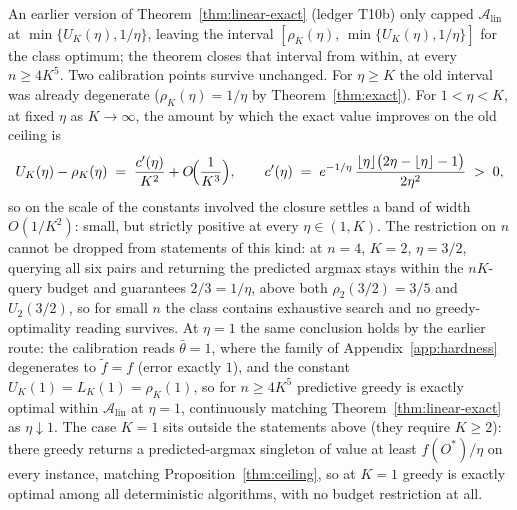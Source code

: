 \begin{remark}\label{rem:greedybudget}
An earlier version of Theorem~\ref{thm:linear-exact} (ledger T10b) only
capped $\mathcal A_{\mathrm{lin}}$ at $\min\{U_K(\eta),1/\eta\}$, leaving
the interval $[\rho_K(\eta),\,\min\{U_K(\eta),1/\eta\}]$ for the class
optimum; the theorem closes that interval from within, at every
$n\ge4K^{5}$.  Two calibration points survive unchanged.  For $\eta\ge K$
the old interval was already degenerate ($\rho_K(\eta)=1/\eta$ by
Theorem~\ref{thm:exact}).  For $1<\eta<K$, at fixed $\eta$ as
$K\to\infty$, the amount by which the exact value improves on the old
ceiling is
\[
  U_K(\eta)-\rho_K(\eta)\;=\;\frac{c'(\eta)}{K^{2}}+O\!\Bigl(\frac{1}{K^{3}}\Bigr),
  \qquad
  c'(\eta)\;=\;e^{-1/\eta}\,
  \frac{\lfloor\eta\rfloor\bigl(2\eta-\lfloor\eta\rfloor-1\bigr)}{2\eta^{2}}
  \;>\;0,
\]
so on the scale of the constants involved the closure settles a band of
width $O(1/K^{2})$: small, but strictly positive at every $\eta\in(1,K)$.
The restriction on $n$ cannot be dropped from statements of this kind: at
$n=4$, $K=2$, $\eta=3/2$, querying all six pairs and returning the
predicted argmax stays within the $nK$-query budget and guarantees
$2/3=1/\eta$, above both $\rho_2(3/2)=3/5$ and $U_2(3/2)$, so for small
$n$ the class contains exhaustive search and no greedy-optimality reading
survives.
At $\eta=1$ the same conclusion holds by the earlier route: the
calibration reads $\bar\theta=1$, where the family of
Appendix~\ref{app:hardness} degenerates to $\tilde f=f$ (error exactly
$1$), and the constant $U_K(1)=L_K(1)=\rho_K(1)$, so for $n\ge4K^{5}$
predictive greedy is exactly optimal within $\mathcal A_{\mathrm{lin}}$
at $\eta=1$, continuously matching Theorem~\ref{thm:linear-exact} as
$\eta\downarrow1$.  The case
$K=1$ sits outside the statements above (they require $K\ge2$): there
greedy returns a predicted-argmax singleton of value at least
$f(O^{\ast})/\eta$ on every instance, matching Proposition~\ref{thm:ceiling},
so at $K=1$ greedy is exactly optimal among all deterministic algorithms,
with no budget restriction at all.
\end{remark}

